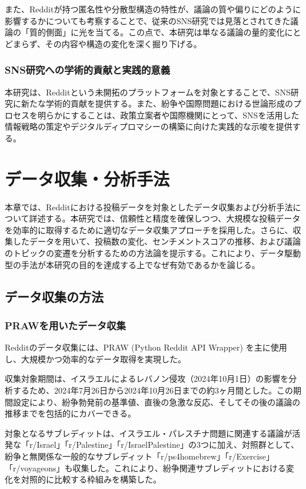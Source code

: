 \documentclass[11pt, a4j]{jreport}
\begin{document}
    また、Redditが持つ匿名性や分散型構造の特性が、議論の質や偏りにどのように影響するかについても考察することで、従来のSNS研究では見落とされてきた議論の「質的側面」に光を当てる。この点で、本研究は単なる議論の量的変化にとどまらず、その内容や構造の変化を深く掘り下げる。

    \subsection{SNS研究への学術的貢献と実践的意義}
    本研究は、Redditという未開拓のプラットフォームを対象とすることで、SNS研究に新たな学術的貢献を提供する。また、紛争や国際問題における世論形成のプロセスを明らかにすることは、政策立案者や国際機関にとって、SNSを活用した情報戦略の策定やデジタルディプロマシーの構築に向けた実践的な示唆を提供する。

    \chapter{データ収集・分析手法}
    本章では、Redditにおける投稿データを対象としたデータ収集および分析手法について詳述する。本研究では、信頼性と精度を確保しつつ、大規模な投稿データを効率的に取得するために適切なデータ収集アプローチを採用した。さらに、収集したデータを用いて、投稿数の変化、センチメントスコアの推移、および議論のトピックの変遷を分析するための方法論を提示する。これにより、データ駆動型の手法が本研究の目的を達成する上でなぜ有効であるかを論じる。

    \section{データ収集の方法}
    \subsection{PRAWを用いたデータ収集}
    Redditのデータ収集には、PRAW (Python Reddit API Wrapper) を主に使用し、大規模かつ効率的なデータ取得を実現した。

    収集対象期間は、イスラエルによるレバノン侵攻（2024年10月1日）の影響を分析するため、2024年7月26日から2024年10月26日までの約3ヶ月間とした。この期間設定により、紛争勃発前の基準値、直後の急激な反応、そしてその後の議論の推移までを包括的にカバーできる。

    対象となるサブレディットは、イスラエル・パレスチナ問題に関連する議論が活発な「r/Israel」「r/Palestine」「r/IsraelPalestine」の3つに加え、対照群として、紛争と無関係な一般的なサブレディット「r/ps4homebrew」「r/Exercise」「r/voyageons」も収集した。これにより、紛争関連サブレディットにおける変化を対照的に比較する枠組みを構築した。
\end{document}
